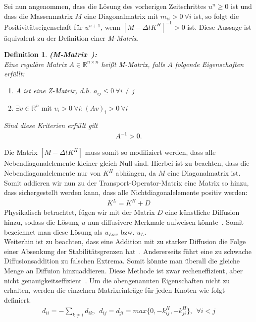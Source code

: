 \documentclass[12pt,titlepage]{article}
\newtheorem{defi}{Definition}[section]
\begin{document}
Sei nun angenommen, dass die Lösung des vorherigen Zeitschrittes $u^n\ge0$ ist und dass die Massenmatrix $M$ eine Diagonalmatrix mit $m_{ii}>0~\forall i$ ist, so folgt die Positivitätseigenschaft für $u^{n+1}$, wenn $[M-\Delta tK^H]^{-1}>0$ ist. Diese Aussage ist äquivalent zu der Definition einer \textit{M-Matrix}.
\begin{defi}\label{def:MMatrix}
 \textbf{(M-Matrix~\cite{fiedler2008special}):}\\
Eine reguläre Matrix $A\in \mathbb{R}^{n\times n}$ heißt M-Matrix, falls $A$ folgende Eigenschaften erfüllt:
\begin{enumerate}
 \item $A$ ist eine Z-Matrix, d.h. $a_{ij}\le0~\forall i\neq j$
 \item $\exists v\in\mathbb{R}^n\text{ mit }v_i>0~\forall i:(Av)_i>0~\forall i$
\end{enumerate}
Sind diese Kriterien erfüllt gilt
\begin{align*}
 A^{-1}>0.
\end{align*}
\end{defi}
 Die Matrix $[M-\Delta tK^H]$ muss somit so modifiziert werden, dass alle Nebendiagonalelemente kleiner gleich Null sind. Hierbei ist zu beachten, dass die Nebendiagonalelemente nur von $K^H$ abhängen, da $M$ eine Diagonalmatrix ist. Somit addieren wir nun zu der Transport-Operator-Matrix eine Matrix so hinzu, dass sichergestellt werden kann, dass alle Nichtdiagonalelemente positiv werden:
\begin{align}
 K^L=K^H+D\label{eq:AddDif}
\end{align}
Physikalisch betrachtet, fügen wir mit der Matrix $D$ eine künstliche Diffusion hinzu, sodass die Lösung $u$ nun diffusivere Merkmale aufweisen könnte~\cite{kuzmin2002flux}. Somit bezeichnet man diese Lösung als $u_{Low}$ bzw. $u_L$.\\
Weiterhin ist zu beachten, dass eine Addition mit zu starker Diffusion die Folge einer Absenkung der Stabilitätsgrenzen hat~\cite{kuzmin2002flux}. Andererseits führt eine zu schwache Diffusionsaddition zu falschen Extrema. Somit könnte man überall die gleiche Menge an Diffuion hinzuaddieren. Diese Methode ist zwar recheneffizient, aber nicht genauigkeitseffizient~\cite{kuzmin2002flux}. Um die obengenannten Eigenschaften nicht zu erhalten, werden die einzelnen Matrixeinträge für jeden Knoten wie folgt definiert:
\begin{align}
 d_{ii}=-\sum_{k\neq i}d_{ik},~~d_{ij}=d_{ji}=max\{0,-k_{ij}^H,-k_{ji}^H\},~~\forall i<j\label{eq:D}
\end{align}
\end{document}
